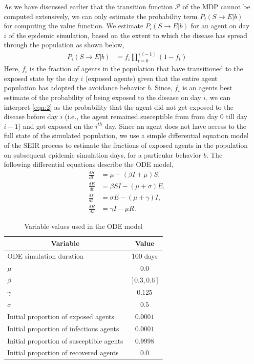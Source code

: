 \documentclass[doublespace]{VTthesis}
\begin{document}
    As we have discussed earlier that the transition function $\mathcal{P}$ of the MDP cannot be computed extensively, we can only estimate the probability term $P_i(S \rightarrow E|b)$ for computing the value function. We estimate $P_i(S \rightarrow E|b)$ for an agent on day $i$ of the epidemic simulation, based on the extent to which the disease has spread through the population as shown below,
    \begin{align}
    P_i(S \rightarrow E|b) &= f_i  \prod_{t=0}^{(i-1)} (1 - f_t)
    \label{eqn:2}
    \end{align}
    Here, $f_i$ is the fraction of agents in the population that have transitioned to the exposed state by the day $i$ (exposed agents) given that the entire agent population has adopted the avoidance behavior $b$. Since, $f_i$ is an agents best estimate of the probability of being exposed to the disease on day $i$, we can interpret \ref{eqn:2} as the probability that the agent did not get exposed to the disease before day $i$ (i.e., the agent remained susceptible from from day $0$ till day $i-1$) and got exposed on the $i^{th}$ day. Since an agent does not have access to the full state of the simulated population, we use a simple differential equation model of the SEIR process \cite{hethcote1976qualitative} to estimate the fractions of exposed agents in the population on subsequent epidemic simulation days, for a particular behavior $b$. The following differential equations describe the ODE model,
    \begin{align*} 
    		\frac{dS}{dt} &= \mu - (\beta I + \mu) S, \\
    		\frac{dE}{dt} &= \beta S I - (\mu + \sigma) E, \\
    		\frac{dI}{dt} &= \sigma E - (\mu + \gamma) I, \\
    		\frac{dR}{dt} &= \gamma I - \mu R.
    \end{align*}
    \begin{table}[!t]
    \renewcommand{\arraystretch}{1.2}
    \caption{Variable values used in the ODE model}
    \centering
    \begin{tabular}{|l|c|}
    \hline
    \multicolumn{1}{|c|}{\textbf{Variable}} & \textbf{Value}  \\ \hline
    ODE simulation duration & $100$ days\\ \hline
    $\mu$ & $0.0$ \\ \hline
    $\beta$ & $[0.3,0.6]$ \\ \hline
    $\gamma$ & $0.125$ \\ \hline
    $\sigma$ & $0.5$ \\ \hline
    Initial proportion of exposed agents & $0.0001$ \\ \hline 
    Initial proportion of infectious agents & $0.0001$ \\ \hline
    Initial proportion of susceptible agents & $0.9998$ \\ \hline
    Initial proportion of recovered agents & $0.0$ \\ \hline
    \end{tabular}
    \label{table:ode}
    \end{table}
\end{document}
